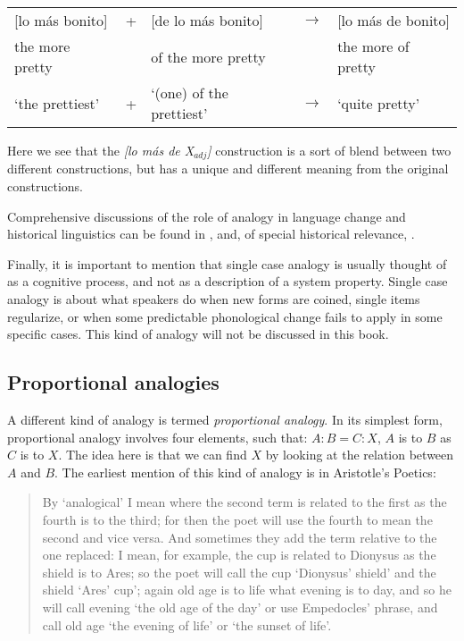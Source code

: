 
\begin{exe}
    \ex \label{analoy-change-syntax-spanish}
    \begin{tabular}[t]{lclcl}
      [lo más bonito] &+ & [de lo más bonito]                   & $\rightarrow$ & [lo más de bonito] \\
      the more pretty &  & of the more pretty                   &               & the more of pretty \\
      `the prettiest'& + & `(one) of the prettiest' & $\rightarrow$ & `quite pretty'     \\
    \end{tabular}
\end{exe}

Here we see that the \textit{[lo más de X$_{adj}$]} construction is a sort of blend between two different constructions, but has a unique and different meaning from the original constructions.

Comprehensive discussions of the role of analogy in language change and historical linguistics can be found in \textcites{Anttila.2003, Hock.1991, Hock.2003, Trask.1996}, and, of special historical relevance, \textcite{Paul.1995}.

Finally, it is important to mention that single case analogy is usually thought of as a cognitive process, and not as a description of a system property. Single case analogy is about what speakers do when new forms are coined, single items regularize, or when some predictable phonological change fails to apply in some specific cases. This kind of analogy will not be discussed in this book.

\subsection{Proportional analogies}


A different kind of analogy is termed \textit{proportional analogy}. In its simplest form, proportional analogy involves four elements, such that: $A:B=C:X$, $A$ is to $B$ as $C$ is to $X$. The idea here is that we can find $X$ by looking at the relation between $A$ and $B$. The earliest mention of this kind of analogy is in Aristotle's Poetics:

\begin{quotation}
  By `analogical' I mean where the second term is related to the first as the fourth is to the third; for then the poet will use the fourth to mean the second and vice versa. And sometimes they add the term relative to the one replaced: I mean, for example, the cup is related to Dionysus as the shield is to Ares; so the poet will call the cup `Dionysus' shield' and the shield `Ares' cup'; again old age is to life what evening is to day, and so he will call evening `the old age of the day' or use Empedocles' phrase, and call old age `the evening of life' or `the sunset of life'. \autocite[chapter III]{Russell.1989}
\end{quotation}

